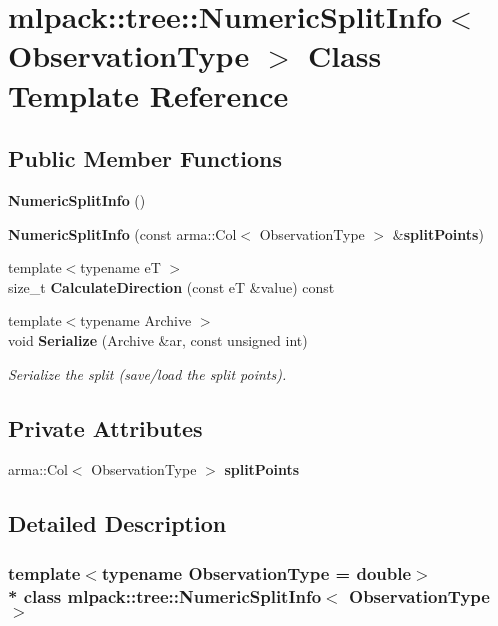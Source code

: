 \section{mlpack\+:\+:tree\+:\+:Numeric\+Split\+Info$<$ Observation\+Type $>$ Class Template Reference}
\label{classmlpack_1_1tree_1_1NumericSplitInfo}
\subsection*{Public Member Functions}
\begin{DoxyCompactItemize}
\item 
{\bf Numeric\+Split\+Info} ()
\item 
{\bf Numeric\+Split\+Info} (const arma\+::\+Col$<$ Observation\+Type $>$ \&{\bf split\+Points})
\item 
{\footnotesize template$<$typename eT $>$ }\\size\+\_\+t {\bf Calculate\+Direction} (const eT \&value) const 
\item 
{\footnotesize template$<$typename Archive $>$ }\\void {\bf Serialize} (Archive \&ar, const unsigned int)
\begin{DoxyCompactList}\small\item\em Serialize the split (save/load the split points). \end{DoxyCompactList}\end{DoxyCompactItemize}
\subsection*{Private Attributes}
\begin{DoxyCompactItemize}
\item 
arma\+::\+Col$<$ Observation\+Type $>$ {\bf split\+Points}
\end{DoxyCompactItemize}


\subsection{Detailed Description}
\subsubsection*{template$<$typename Observation\+Type = double$>$\\*
class mlpack\+::tree\+::\+Numeric\+Split\+Info$<$ Observation\+Type $>$}



